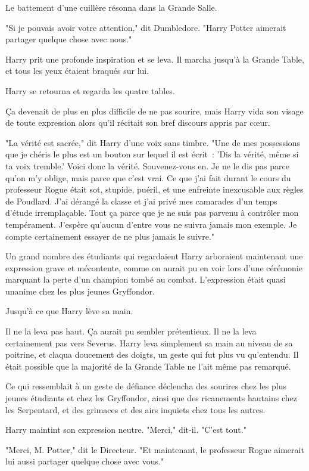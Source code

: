 Le battement d'une cuillère résonna dans la Grande Salle.

"Si je pouvais avoir votre attention," dit Dumbledore. "Harry Potter aimerait partager quelque chose avec nous."

Harry prit une profonde inspiration et se leva. Il marcha jusqu'à la Grande Table, et tous les yeux étaient braqués sur lui.

Harry se retourna et regarda les quatre tables.

Ça devenait de plus en plus difficile de ne pas sourire, mais Harry vida son visage de toute expression alors qu'il récitait son bref discours appris par cœur.

"La vérité est sacrée," dit Harry d'une voix sans timbre. "Une de mes possessions que je chéris le plus est un bouton sur lequel il est écrit~: 'Dis la vérité, même si ta voix tremble.' Voici donc la vérité. Souvenez-vous en. Je ne le dis pas parce qu'on m'y oblige, mais parce que c'est vrai. Ce que j'ai fait durant le cours du professeur Rogue était sot, stupide, puéril, et une enfreinte inexcusable aux règles de Poudlard. J'ai dérangé la classe et j'ai privé mes camarades d'un temps d'étude irremplaçable. Tout ça parce que je ne suis pas parvenu à contrôler mon tempérament. J'espère qu'aucun d'entre vous ne suivra jamais mon exemple. Je compte certainement essayer de ne plus jamais le suivre."

Un grand nombre des étudiants qui regardaient Harry arboraient maintenant une expression grave et mécontente, comme on aurait pu en voir lors d'une cérémonie marquant la perte d'un champion tombé au combat. L'expression était quasi unanime chez les plus jeunes Gryffondor.

Jusqu'à ce que Harry lève sa main.

Il ne la leva pas haut. Ça aurait pu sembler prétentieux. Il ne la leva certainement pas vers Severus. Harry leva simplement sa main au niveau de sa poitrine, et claqua doucement des doigts, un geste qui fut plus vu qu'entendu. Il était possible que la majorité de la Grande Table ne l'ait même pas remarqué.

Ce qui ressemblait à un geste de défiance déclencha des sourires chez les plus jeunes étudiants et chez les Gryffondor, ainsi que des ricanements hautains chez les Serpentard, et des grimaces et des airs inquiets chez tous les autres.

Harry maintint son expression neutre. "Merci," dit-il. "C'est tout."

"Merci, M. Potter," dit le Directeur. "Et maintenant, le professeur Rogue aimerait lui aussi partager quelque chose avec vous."

